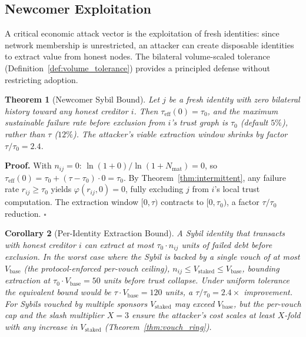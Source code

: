 \documentclass[11pt]{article}
\newtheorem{theorem}{Theorem}[section]
\newtheorem{corollary}[theorem]{Corollary}
\newcommand{\qed}{\hfill}
\newenvironment{proof}{\noindent\textbf{Proof.}}{\qed$\square$\par\medskip}
\begin{document}
\subsection{Newcomer Exploitation}\label{sec:newcomer}

A critical economic attack vector is the exploitation of fresh identities: since network membership is unrestricted, an attacker can create disposable identities to extract value from honest nodes. The bilateral volume-scaled tolerance (Definition~\ref{def:volume_tolerance}) provides a principled defense without restricting adoption.

\begin{theorem}[Newcomer Sybil Bound]\label{thm:newcomer_bound}
Let $j$ be a fresh identity with zero bilateral history toward any honest creditor $i$. Then $\tau_{\text{eff}}(0) = \tau_0$, and the maximum sustainable failure rate before exclusion from $i$'s trust graph is $\tau_0$ (default $5\%$), rather than $\tau$ ($12\%$). The attacker's viable extraction window shrinks by factor $\tau / \tau_0 = 2.4$.
\end{theorem}

\begin{proof}
With $n_{ij} = 0$: $\ln(1 + 0) / \ln(1 + N_{\text{mat}}) = 0$, so $\tau_{\text{eff}}(0) = \tau_0 + (\tau - \tau_0) \cdot 0 = \tau_0$. By Theorem~\ref{thm:intermittent}, any failure rate $r_{ij} \geq \tau_0$ yields $\varphi(r_{ij}, 0) = 0$, fully excluding $j$ from $i$'s local trust computation. The extraction window $[0, \tau)$ contracts to $[0, \tau_0)$, a factor $\tau / \tau_0$ reduction. \qed
\end{proof}

\begin{corollary}[Per-Identity Extraction Bound]
A Sybil identity that transacts with honest creditor $i$ can extract at most $\tau_0 \cdot n_{ij}$ units of failed debt before exclusion. In the worst case where the Sybil is backed by a single vouch of at most $V_{\text{base}}$ (the protocol-enforced per-vouch ceiling), $n_{ij} \leq V_{\text{staked}} \leq V_{\text{base}}$, bounding extraction at $\tau_0 \cdot V_{\text{base}} = 50$ units before trust collapse. Under uniform tolerance the equivalent bound would be $\tau \cdot V_{\text{base}} = 120$ units, a $\tau/\tau_0 = 2.4\times$ improvement. For Sybils vouched by multiple sponsors $V_{\text{staked}}$ may exceed $V_{\text{base}}$, but the per-vouch cap and the slash multiplier $X = 3$ ensure the attacker's cost scales at least $X$-fold with any increase in $V_{\text{staked}}$ (Theorem~\ref{thm:vouch_ring}).
\end{corollary}
\end{document}
